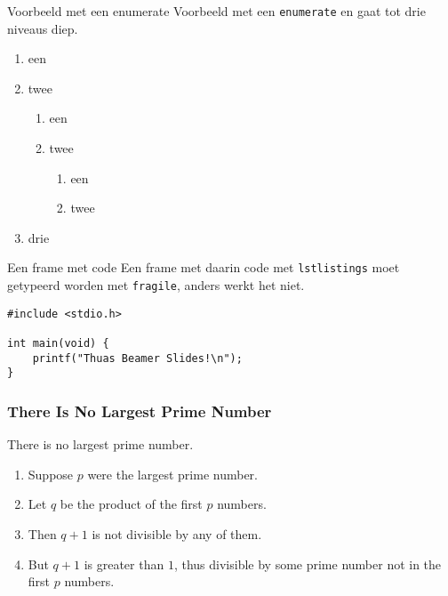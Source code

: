 \documentclass[fleqn,aspectratio=43]{beamer}
\begin{document}
\begin{frame}{Voorbeeld met een enumerate}
Voorbeeld met een \texttt{enumerate} en gaat tot drie niveaus diep.
\begin{enumerate}
\item een
\item twee
\begin{enumerate}
\item een
\item twee
\begin{enumerate}
\item een
\item twee
\end{enumerate}
\end{enumerate}
\item drie
\end{enumerate}
\end{frame}

\begin{frame}[fragile]{Een frame met code}
Een frame met daarin code met \texttt{lstlistings} moet getypeerd worden met \texttt{fragile}, anders werkt het niet.

\begin{lstlisting}
#include <stdio.h>

int main(void) {
    printf("Thuas Beamer Slides!\n");
}
\end{lstlisting}
\end{frame}

\begin{frame} 
\frametitle{There Is No Largest Prime Number} 
\begin{theorem}
There is no largest prime number.
\end{theorem} 
\begin{enumerate} 
\item<1-| alert@1> Suppose $p$ were the largest prime number. 
\item<2-> Let $q$ be the product of the first $p$ numbers. 
\item<3-> Then $q+1$ is not divisible by any of them. 
\item<1-> But $q + 1$ is greater than $1$, thus divisible by some prime
number not in the first $p$ numbers.
\end{enumerate}
\end{frame}
\end{document}
